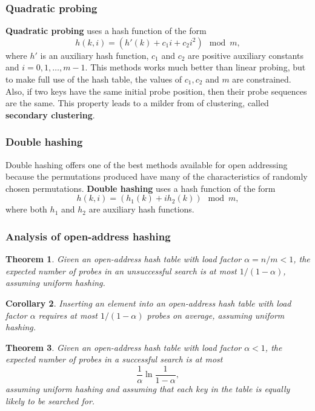 \documentclass[12pt]{article}
\newtheorem{theorem}{Theorem}
\newtheorem{corollary}[theorem]{Corollary}
\begin{document}
\subsubsection*{Quadratic probing}

\textbf {Quadratic probing} uses a hash function of the form
\begin{equation*}
  h(k,i) = (h'(k) + c_1 i + c_2 i^2) \mod m,
\end{equation*}
where $h'$ is an auxiliary hash function, $c_1$ and $c_2$ are positive auxiliary constants and $i = 0,1,\dots,m-1$. This methods works much better than linear probing, but to make full use of the hash table, the values of $c_1, c_2$ and $m$ are constrained. Also, if two keys have the same initial probe position, then their probe sequences are the same. This property leads to a milder from of clustering, called \textbf {secondary clustering}.

\subsubsection*{Double hashing}

Double hashing offers one of the best methods available for open addressing because the permutations produced have many of the characteristics of randomly chosen permutations. \textbf {Double hashing} uses a hash function of the form
\begin{equation*}
  h(k,i) = (h_1(k) + ih_2(k)) \mod m,
\end{equation*}
where both $h_1$ and $h_2$ are auxiliary hash functions.

\subsubsection*{Analysis of open-address hashing}

\begin{theorem}
  Given an open-address hash table with load factor $\alpha =n/m < 1$, the expected number of probes in an unsuccessful search is at most $1/(1-\alpha)$, assuming uniform hashing.
\end{theorem}

\begin{corollary}
  Inserting an element into an open-address hash table with load factor $\alpha$ requires at most $1/(1-\alpha)$ probes on average, assuming uniform hashing.
\end{corollary}

\begin{theorem}
  Given an open-address hash table with load factor $\alpha < 1$, the expected number of probes in a successful search is at most
  \begin{equation*}
    \frac {1}{\alpha} \ln \frac {1}{1 - \alpha},
  \end{equation*}
  assuming uniform hashing and assuming that each key in the table is equally likely to be searched for.
\end{theorem}
\end{document}
